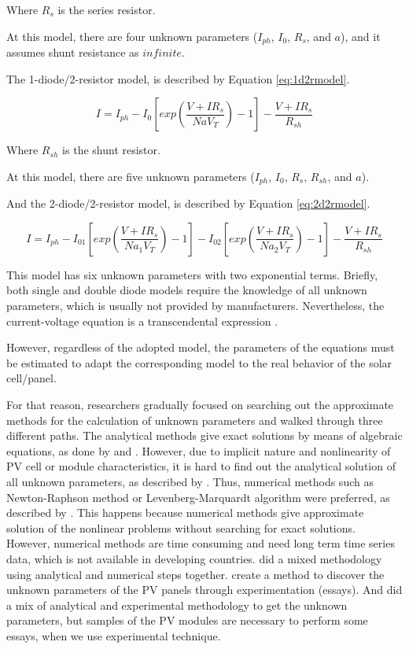 Where $R_{s}$ is the series resistor.

At this model, there are four unknown parameters ($ I_{ph}$, $I_{0}$, $ R_{s} $, and $ a $), and it assumes shunt resistance as $ infinite $.

The 1-diode/2-resistor model, is described by Equation \ref{eq:1d2rmodel}. 

\begin{equation}
\label{eq:1d2rmodel}
I =I_{ph}-I_{0}\left[ exp \left( \dfrac{V+IR_{s}}{NaV_{T}} \right) -1 \right] - \dfrac{V+IR_{s}}{R_{sh}}
\end{equation}

Where $R_{sh}$ is the shunt resistor.

At this model, there are five unknown parameters ($ I_{ph}$, $I_{0}$, $ R_{s} $, $ R_{sh} $, and $ a $).

And the 2-diode/2-resistor model, is described by Equation \ref{eq:2d2rmodel}. 

\begin{equation}
\label{eq:2d2rmodel}
I =I_{ph}-I_{01}\left[ exp \left( \dfrac{V+IR_{s}}{Na_{1}V_{T}} \right) -1 \right] - I_{02}\left[ exp \left( \dfrac{V+IR_{s}}{Na_{2}V_{T}} \right) -1 \right] - \dfrac{V+IR_{s}}{R_{sh}}
\end{equation}

This model has six unknown parameters with two exponential terms. 
Briefly, both single and double diode models require the knowledge of all unknown parameters, which is usually not provided by manufacturers. Nevertheless, the current-voltage equation is a transcendental expression \cite{Jakhrani}.  

However, regardless of the adopted model, the parameters of the equations must be estimated to adapt the corresponding model to the real behavior of the solar cell/panel. 

For that reason, researchers gradually focused on searching out the approximate methods for the calculation of unknown parameters and walked through three different paths. The analytical methods give exact solutions by means of algebraic equations, as done by \cite{Cubas} and \cite{Brano}. However, due to implicit nature and nonlinearity of PV cell or module characteristics, it is hard to find out the analytical solution of all unknown parameters, as described by \cite{Hasan}. Thus, numerical methods such as Newton-Raphson method or Levenberg-Marquardt algorithm were preferred, as described by \cite{Mellit}. This happens because numerical methods give approximate solution of the nonlinear problems without searching for exact solutions. However, numerical methods are time consuming and need long term time series data, which is not available in developing countries. \cite{Jakhrani} did a mixed methodology using analytical and numerical steps together.  \cite{Shenawy} create a method to discover the unknown parameters of the PV panels through experimentation (essays). And \cite{Tian} did a mix of analytical and experimental methodology to get the unknown parameters, but samples of the PV modules are necessary to perform some essays, when we use experimental technique. 

